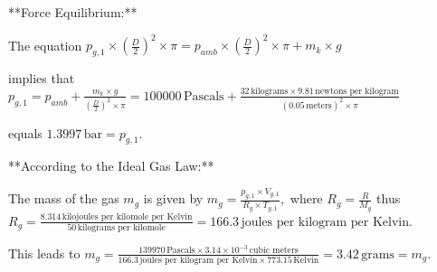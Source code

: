 **Force Equilibrium:**

The equation \( p_{g,1} \times \left(\frac{D}{2}\right)^2 \times \pi = p_{amb} \times \left(\frac{D}{2}\right)^2 \times \pi + m_k \times g \)

implies that \( p_{g,1} = p_{amb} + \frac{m_k \times g}{\left(\frac{D}{2}\right)^2 \times \pi} = 100000 \, \text{Pascals} + \frac{32 \, \text{kilograms} \times 9.81 \, \text{newtons per kilogram}}{(0.05 \, \text{meters})^2 \times \pi} \)

equals \( \boxed{1.3997 \, \text{bar} = p_{g,1}} \).

**According to the Ideal Gas Law:**

The mass of the gas \( m_g \) is given by \( m_g = \frac{p_{g,1} \times V_{g,1}}{R_g \times T_{g,1}}, \) where \( R_g = \frac{R}{M_g} \) thus \( R_g = \frac{8.314 \, \text{kilojoules per kilomole per Kelvin}}{50 \, \text{kilograms per kilomole}} = 166.3 \, \text{joules per kilogram per Kelvin} \).

This leads to \( m_g = \frac{139970 \, \text{Pascals} \times 3.14 \times 10^{-3} \, \text{cubic meters}}{166.3 \, \text{joules per kilogram per Kelvin} \times 773.15 \, \text{Kelvin}} = \boxed{3.42 \, \text{grams} = m_g} \).